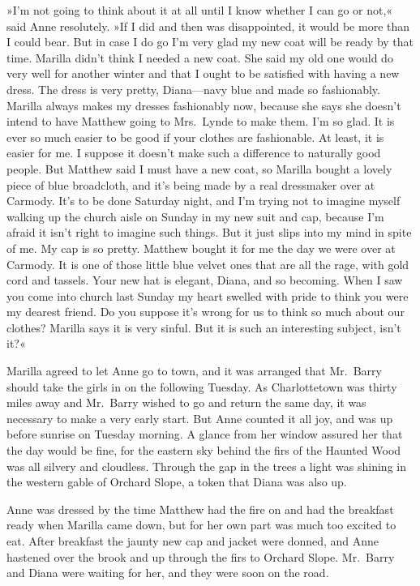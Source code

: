 »I'm not going to think about it at all until I know whether I can go or not,« said Anne resolutely. »If I did and then was disappointed, it would be more than I could bear. But in case I do go I'm very glad my new coat will be ready by that time. Marilla didn't think I needed a new coat. She said my old one would do very well for another winter and that I ought to be satisfied with having a new dress. The dress is very pretty, Diana—navy blue and made so fashionably. Marilla always makes my dresses fashionably now, because she says she doesn't intend to have Matthew going to Mrs.~Lynde to make them. I'm so glad. It is ever so much easier to be good if your clothes are fashionable. At least, it is easier for me. I suppose it doesn't make such a difference to naturally good people. But Matthew said I must have a new coat, so Marilla bought a lovely piece of blue broadcloth, and it's being made by a real dressmaker over at Carmody. It's to be done Saturday night, and I'm trying not to imagine myself walking up the church aisle on Sunday in my new suit and cap, because I'm afraid it isn't right to imagine such things. But it just slips into my mind in spite of me. My cap is so pretty. Matthew bought it for me the day we were over at Carmody. It is one of those little blue velvet ones that are all the rage, with gold cord and tassels. Your new hat is elegant, Diana, and so becoming. When I saw you come into church last Sunday my heart swelled with pride to think you were my dearest friend. Do you suppose it's wrong for us to think so much about our clothes? Marilla says it is very sinful. But it is such an interesting subject, isn't it?«

Marilla agreed to let Anne go to town, and it was arranged that Mr.~Barry should take the girls in on the following Tuesday. As Charlottetown was thirty miles away and Mr.~Barry wished to go and return the same day, it was necessary to make a very early start. But Anne counted it all joy, and was up before sunrise on Tuesday morning. A glance from her window assured her that the day would be fine, for the eastern sky behind the firs of the Haunted Wood was all silvery and cloudless. Through the gap in the trees a light was shining in the western gable of Orchard Slope, a token that Diana was also up.

Anne was dressed by the time Matthew had the fire on and had the breakfast ready when Marilla came down, but for her own part was much too excited to eat. After breakfast the jaunty new cap and jacket were donned, and Anne hastened over the brook and up through the firs to Orchard Slope. Mr.~Barry and Diana were waiting for her, and they were soon on the road.

